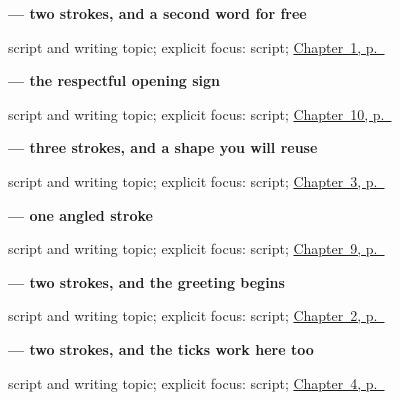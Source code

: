 \noindent\begin{minipage}[t]{\linewidth}
\raggedright
\textbf{ — two strokes, and a second word for free}\par
\footnotesize script and writing topic; explicit focus: script; \hyperref[ch:ja-two-answers]{Chapter~1, p.~\pageref*{ch:ja-two-answers}}
\end{minipage}\par\smallskip

\noindent\begin{minipage}[t]{\linewidth}
\raggedright
\textbf{ — the respectful opening sign}\par
\footnotesize script and writing topic; explicit focus: script; \hyperref[ch:ja-slower-please]{Chapter~10, p.~\pageref*{ch:ja-slower-please}}
\end{minipage}\par\smallskip

\noindent\begin{minipage}[t]{\linewidth}
\raggedright
\textbf{ — three strokes, and a shape you will reuse}\par
\footnotesize script and writing topic; explicit focus: script; \hyperref[ch:ja-plain-thanks]{Chapter~3, p.~\pageref*{ch:ja-plain-thanks}}
\end{minipage}\par\smallskip

\noindent\begin{minipage}[t]{\linewidth}
\raggedright
\textbf{ — one angled stroke}\par
\footnotesize script and writing topic; explicit focus: script; \hyperref[ch:ja-repeat-please]{Chapter~9, p.~\pageref*{ch:ja-repeat-please}}
\end{minipage}\par\smallskip

\noindent\begin{minipage}[t]{\linewidth}
\raggedright
\textbf{ — two strokes, and the greeting begins}\par
\footnotesize script and writing topic; explicit focus: script; \hyperref[ch:ja-daytime-greeting]{Chapter~2, p.~\pageref*{ch:ja-daytime-greeting}}
\end{minipage}\par\smallskip

\noindent\begin{minipage}[t]{\linewidth}
\raggedright
\textbf{ — two strokes, and the ticks work here too}\par
\footnotesize script and writing topic; explicit focus: script; \hyperref[ch:ja-polite-thanks]{Chapter~4, p.~\pageref*{ch:ja-polite-thanks}}
\end{minipage}\par\smallskip

